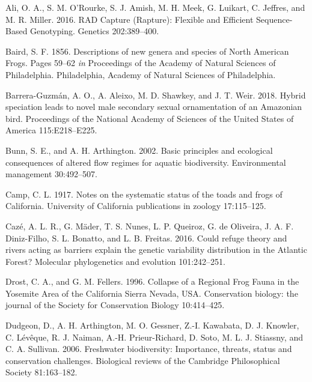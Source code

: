 \documentclass[twoside,12pt,final]{ucthesis-CA2012}
\begin{document}
\begin{ucmainmatter}
\leavevmode\hypertarget{ref-ali_rad_2016}{}%
Ali, O. A., S. M. O'Rourke, S. J. Amish, M. H. Meek, G. Luikart, C.
Jeffres, and M. R. Miller. 2016. RAD Capture (Rapture): Flexible and
Efficient Sequence-Based Genotyping. Genetics 202:389--400.

\leavevmode\hypertarget{ref-baird_descriptions_1856}{}%
Baird, S. F. 1856. Descriptions of new genera and species of North
American Frogs. Pages 59--62 \emph{in} Proceedings of the Academy of
Natural Sciences of Philadelphia. Philadelphia, Academy of Natural
Sciences of Philadelphia.

\leavevmode\hypertarget{ref-barrera-guzman_hybrid_2018}{}%
Barrera-Guzmán, A. O., A. Aleixo, M. D. Shawkey, and J. T. Weir. 2018.
Hybrid speciation leads to novel male secondary sexual ornamentation of
an Amazonian bird. Proceedings of the National Academy of Sciences of
the United States of America 115:E218--E225.

\leavevmode\hypertarget{ref-bunn_basic_2002}{}%
Bunn, S. E., and A. H. Arthington. 2002. Basic principles and ecological
consequences of altered flow regimes for aquatic biodiversity.
Environmental management 30:492--507.

\leavevmode\hypertarget{ref-camp_notes_1917}{}%
Camp, C. L. 1917. Notes on the systematic status of the toads and frogs
of California. University of California publications in zoology
17:115--125.

\leavevmode\hypertarget{ref-caze_could_2016}{}%
Cazé, A. L. R., G. Mäder, T. S. Nunes, L. P. Queiroz, G. de Oliveira, J.
A. F. Diniz-Filho, S. L. Bonatto, and L. B. Freitas. 2016. Could refuge
theory and rivers acting as barriers explain the genetic variability
distribution in the Atlantic Forest? Molecular phylogenetics and
evolution 101:242--251.

\leavevmode\hypertarget{ref-drost_collapse_1996}{}%
Drost, C. A., and G. M. Fellers. 1996. Collapse of a Regional Frog Fauna
in the Yosemite Area of the California Sierra Nevada, USA. Conservation
biology: the journal of the Society for Conservation Biology
10:414--425.

\leavevmode\hypertarget{ref-dudgeon_freshwater_2006}{}%
Dudgeon, D., A. H. Arthington, M. O. Gessner, Z.-I. Kawabata, D. J.
Knowler, C. Lévêque, R. J. Naiman, A.-H. Prieur-Richard, D. Soto, M. L.
J. Stiassny, and C. A. Sullivan. 2006. Freshwater biodiversity:
Importance, threats, status and conservation challenges. Biological
reviews of the Cambridge Philosophical Society 81:163--182.


\end{ucmainmatter}
\end{document}

